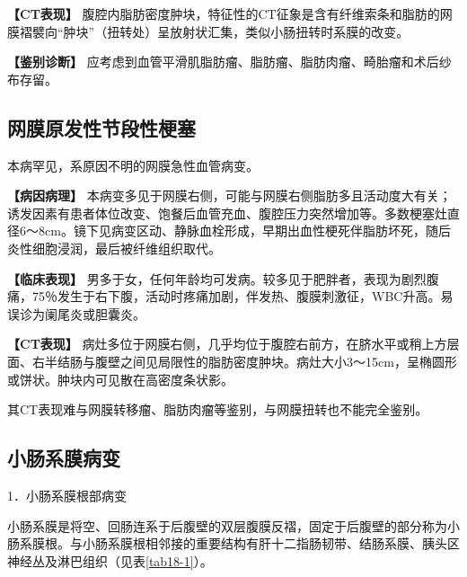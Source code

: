 \textbf{【CT表现】}
腹腔内脂肪密度肿块，特征性的CT征象是含有纤维索条和脂肪的网膜褶襞向“肿块”（扭转处）呈放射状汇集，类似小肠扭转时系膜的改变。

\textbf{【鉴别诊断】}
应考虑到血管平滑肌脂肪瘤、脂肪瘤、脂肪肉瘤、畸胎瘤和术后纱布存留。

\subsection{网膜原发性节段性梗塞}

本病罕见，系原因不明的网膜急性血管病变。

\textbf{【病因病理】}
本病变多见于网膜右侧，可能与网膜右侧脂肪多且活动度大有关；诱发因素有患者体位改变、饱餐后血管充血、腹腔压力突然增加等。多数梗塞灶直径6～8cm。镜下见病变区动、静脉血栓形成，早期出血性梗死伴脂肪坏死，随后炎性细胞浸润，最后被纤维组织取代。

\textbf{【临床表现】}
男多于女，任何年龄均可发病。较多见于肥胖者，表现为剧烈腹痛，75％发生于右下腹，活动时疼痛加剧，伴发热、腹膜刺激征，WBC升高。易误诊为阑尾炎或胆囊炎。

\textbf{【CT表现】}
病灶多位于网膜右侧，几乎均位于腹腔右前方，在脐水平或稍上方层面、右半结肠与腹壁之间见局限性的脂肪密度肿块。病灶大小3～15cm，呈椭圆形或饼状。肿块内可见散在高密度条状影。

其CT表现难与网膜转移瘤、脂肪肉瘤等鉴别，与网膜扭转也不能完全鉴别。

\subsection{小肠系膜病变}

1．小肠系膜根部病变

小肠系膜是将空、回肠连系于后腹壁的双层腹膜反褶，固定于后腹壁的部分称为小肠系膜根。与小肠系膜根相邻接的重要结构有肝十二指肠韧带、结肠系膜、胰头区神经丛及淋巴组织（见表\ref{tab18-1}）。

